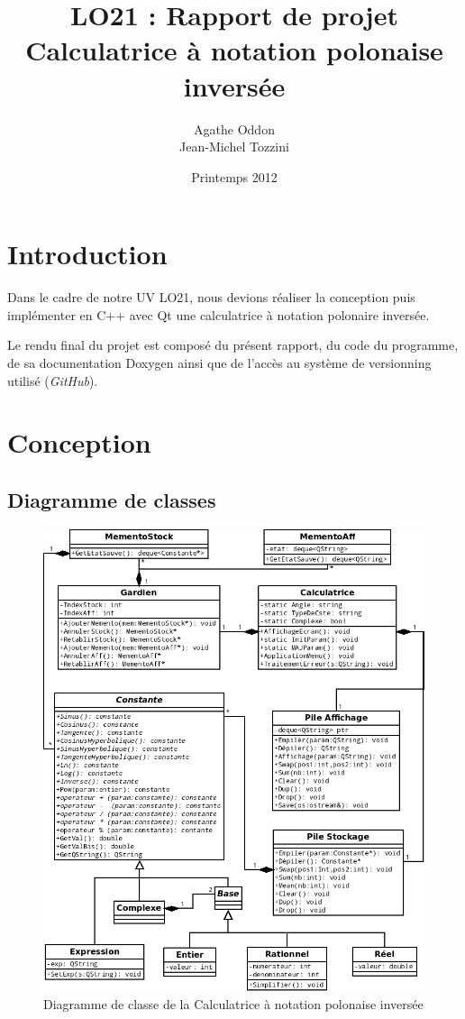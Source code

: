 \documentclass[a4paper,11pt]{article}
\begin{document}
\title{LO21 : Rapport de projet\\Calculatrice à notation polonaise inversée}
\author{Agathe Oddon\\Jean-Michel Tozzini}
\date{Printemps 2012}

\maketitle

\section*{Introduction}
Dans le cadre de notre UV LO21, nous devions réaliser la conception puis implémenter en C++ avec Qt une calculatrice à notation polonaire inversée.

Le rendu final du projet est composé du présent rapport, du code du programme, de sa documentation Doxygen ainsi que de l'accès au système de versionning utilisé (\textit{GitHub}).

\tableofcontents

\section{Conception}
\subsection{Diagramme de classes}
\begin{figure}[H]
	\center
	\includegraphics[width=16.7cm]{UMLProjetLO21v3.png}
	\caption{Diagramme de classe de la Calculatrice à notation polonaise inversée}
\end{figure}
\end{document}

